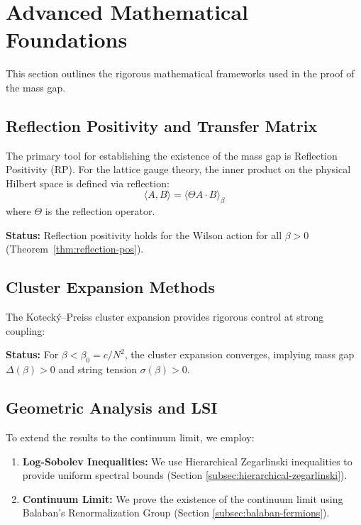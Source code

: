 \section{Advanced Mathematical Foundations}
\label{sec:advanced-foundations}

This section outlines the rigorous mathematical frameworks used in the proof 
of the mass gap.

\subsection{Reflection Positivity and Transfer Matrix}
\label{sec:rp-foundations}

The primary tool for establishing the existence of the mass gap is Reflection Positivity (RP).
For the lattice gauge theory, the inner product on the physical Hilbert space is defined via reflection:
\[
\langle A, B \rangle = \langle \Theta A \cdot B \rangle_\beta
\]
where $\Theta$ is the reflection operator.

\textbf{Status:} Reflection positivity holds for the Wilson action 
for all $\beta > 0$ (Theorem~\ref{thm:reflection-pos}).

\subsection{Cluster Expansion Methods}
\label{sec:cluster-foundations}

The Koteck\'y--Preiss cluster expansion provides rigorous control at strong coupling:

\textbf{Status:} For $\beta < \beta_0 = c/N^2$, the cluster expansion 
converges, implying mass gap $\Delta(\beta) > 0$ and string tension $\sigma(\beta) > 0$.

\subsection{Geometric Analysis and LSI}
\label{sec:geometric-foundations}

To extend the results to the continuum limit, we employ:

\begin{enumerate}
\item \textbf{Log-Sobolev Inequalities:} We use Hierarchical Zegarlinski inequalities to provide uniform spectral bounds (Section \ref{subsec:hierarchical-zegarlinski}).

\item \textbf{Continuum Limit:} We prove the existence of the continuum limit using Balaban's Renormalization Group (Section \ref{subsec:balaban-fermions}).
\end{enumerate}





